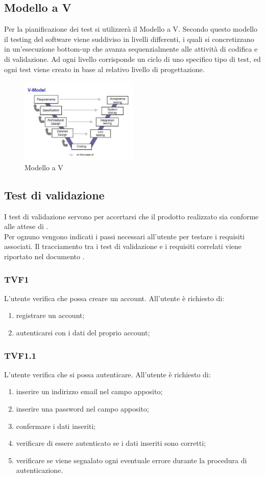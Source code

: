 	\subsection{Modello a V}
	\label{sec:5.2}
			Per la pianificazione dei test si utilizzerà il Modello a V. Secondo questo modello il testing del software viene suddiviso in livelli differenti, i quali si concretizzano in un'esecuzione bottom-up che avanza sequenzialmente alle attività di codifica e di validazione. Ad ogni livello corrisponde un ciclo di uno specifico tipo di test, ed ogni test viene creato in base al relativo livello di progettazione.
			\begin{figure}[htp]
				\centering
				\includegraphics[width=0.5\textwidth]{img/V-model.jpg}
				\caption{Modello a V}
			\end{figure}
	\subsection{Test di validazione}
	\label{sec:5.3}
		I test di validazione servono per accertarsi che il prodotto realizzato sia conforme alle attese di \PROPONENTE. \\
		Per ognuno vengono indicati i passi necessari all'utente per testare i requisiti associati. Il tracciamento tra i test di validazione e i requisiti correlati viene riportato nel documento \ARdoc.
		\subsubsection{TVF1}
			L'utente verifica che possa creare un account. All'utente è richiesto di:
			\begin{enumerate}
				\item registrare un account;
				\item autenticarsi con i dati del proprio account;
			\end{enumerate}
		\subsubsection{TVF1.1}
			L'utente verifica che si possa autenticare. All'utente è richiesto di:
			\begin{enumerate}
				\item inserire un indirizzo email nel campo apposito;
				\item inserire una password nel campo apposito;
				\item confermare i dati inseriti;
				\item verificare di essere autenticato se i dati inseriti sono corretti;
				\item verificare se viene segnalato ogni eventuale errore durante la procedura di autenticazione. 
			\end{enumerate}
